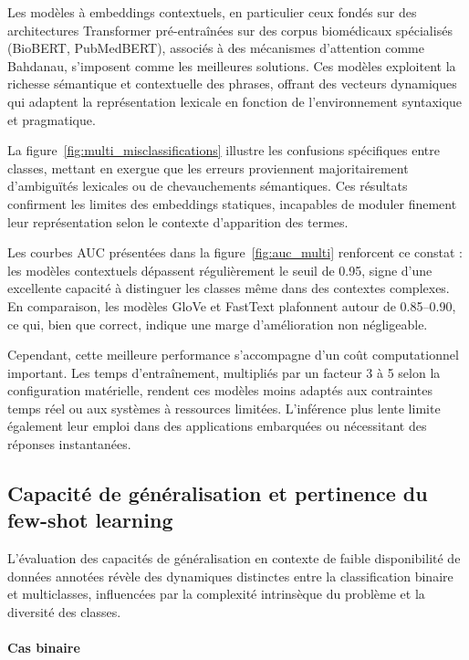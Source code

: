 \documentclass[12pt]{report}
\begin{document}
Les modèles à embeddings contextuels, en particulier ceux fondés sur des architectures Transformer pré-entraînées sur des corpus biomédicaux spécialisés (BioBERT, PubMedBERT), associés à des mécanismes d’attention comme Bahdanau, s’imposent comme les meilleures solutions. Ces modèles exploitent la richesse sémantique et contextuelle des phrases, offrant des vecteurs dynamiques qui adaptent la représentation lexicale en fonction de l’environnement syntaxique et pragmatique.

La figure~\ref{fig:multi_misclassifications} illustre les confusions spécifiques entre classes, mettant en exergue que les erreurs proviennent majoritairement d’ambiguïtés lexicales ou de chevauchements sémantiques. Ces résultats confirment les limites des embeddings statiques, incapables de moduler finement leur représentation selon le contexte d’apparition des termes.

Les courbes AUC présentées dans la figure~\ref{fig:auc_multi} renforcent ce constat : les modèles contextuels dépassent régulièrement le seuil de 0.95, signe d’une excellente capacité à distinguer les classes même dans des contextes complexes. En comparaison, les modèles GloVe et FastText plafonnent autour de 0.85–0.90, ce qui, bien que correct, indique une marge d’amélioration non négligeable.

Cependant, cette meilleure performance s’accompagne d’un coût computationnel important. Les temps d’entraînement, multipliés par un facteur 3 à 5 selon la configuration matérielle, rendent ces modèles moins adaptés aux contraintes temps réel ou aux systèmes à ressources limitées. L’inférence plus lente limite également leur emploi dans des applications embarquées ou nécessitant des réponses instantanées.

\subsection{Capacité de généralisation et pertinence du few-shot learning}

L’évaluation des capacités de généralisation en contexte de faible disponibilité de données annotées révèle des dynamiques distinctes entre la classification binaire et multiclasses, influencées par la complexité intrinsèque du problème et la diversité des classes.

\paragraph{Cas binaire}
\end{document}
